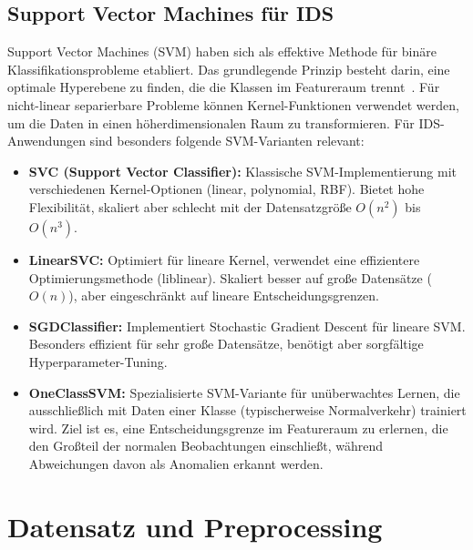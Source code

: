 \documentclass[12pt,oneside]{article}
\begin{document}
	\subsection{Support Vector Machines für IDS}
	Support Vector Machines (SVM) haben sich als effektive Methode für binäre Klassifikationsprobleme etabliert. Das grundlegende Prinzip besteht darin, eine optimale Hyperebene zu finden, die die Klassen im Featureraum trennt~\cite{evgeniou2001}. Für nicht-linear separierbare Probleme können Kernel-Funktionen verwendet werden, um die Daten in einen höherdimensionalen Raum zu transformieren.
	Für IDS-Anwendungen sind besonders folgende SVM-Varianten relevant:
	\begin{itemize}
		\item \textbf{SVC (Support Vector Classifier):} Klassische SVM-Implementierung mit verschiedenen Kernel-Optionen (linear, polynomial, RBF). Bietet hohe Flexibilität, skaliert aber schlecht mit der Datensatzgröße 
		$O(n^2)$ bis $O(n^3)$.
		
		\item \textbf{LinearSVC:} Optimiert für lineare Kernel, verwendet eine effizientere Optimierungsmethode (liblinear). Skaliert besser auf große Datensätze ($O(n)$), aber eingeschränkt auf lineare Entscheidungsgrenzen.
		
		\item \textbf{SGDClassifier:} Implementiert Stochastic Gradient Descent für lineare SVM. Besonders effizient für sehr große Datensätze, benötigt aber sorgfältige Hyperparameter-Tuning.
		
		\item \textbf{OneClassSVM:} Spezialisierte SVM-Variante für unüberwachtes Lernen, die ausschließlich mit Daten einer Klasse (typischerweise Normalverkehr) trainiert wird. Ziel ist es, eine Entscheidungsgrenze im Featureraum zu erlernen, die den Großteil der normalen Beobachtungen einschließt, während Abweichungen davon als Anomalien erkannt werden.
		
	\end{itemize}
	
	\section{Datensatz und Preprocessing}
	\label{sec:dataset}
\end{document}
